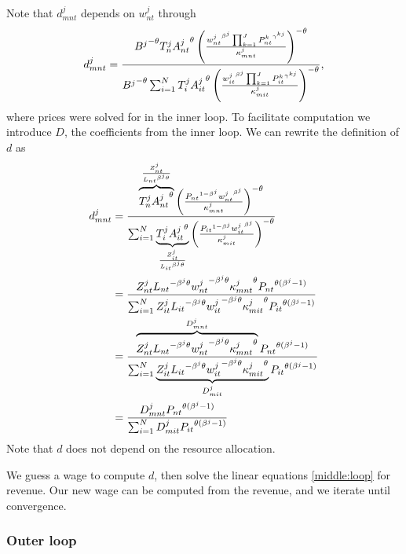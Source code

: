 \documentclass[12pt]{article}
\begin{document}
Note that $d^j_{mnt}$ depends on $w_{nt}^j$ through 
\begin{equation*}
d_{mnt}^j = \frac{{B^j}^{-\theta} T_n^j {A_{nt}^j}^{\theta} \left(\frac{{%
w_{nt}^j}^{\beta^j} \prod_{k = 1}^{J}{P_{nt}^k}^{\gamma^{kj}} }{%
\kappa_{mnt}^j}\right)^{-\theta}}{{B^j}^{-\theta} \sum_{i = 1}^N T_i^j {%
A_{it}^j}^{\theta} \left(\frac{{w_{it}^j}^{\beta^j} \prod_{k = 1}^{J}{%
P_{it}^k}^{\gamma^{kj}} }{\kappa_{mit}^j}\right)^{-\theta}},
\end{equation*}
where prices were solved for in the inner loop. To facilitate computation we
introduce $D$, the coefficients from the inner loop. We can rewrite the
definition of $d$ as 
\begin{align*}
d_{mnt}^j &= \frac{\overbrace{T_n^j {A_{nt}^j}^{\theta}}^{\frac{Z_{nt}^j}{{%
L_{nt}}^{\beta^j\theta}}} \left(\frac{{P_{nt}}^{1 - \beta^j} {w_{nt}^j}%
^{\beta^j}}{\kappa_{mnt}^j}\right)^{-\theta}}{\sum_{i = 1}^N \underbrace{%
T_i^j {A_{it}^j}^{\theta}}_{\frac{Z_{it}^j}{{L_{it}}^{\beta^j\theta}}} \left(%
\frac{{P_{it}}^{1 - \beta^j} {w_{it}^j}^{\beta^j}}{\kappa_{mit}^j}%
\right)^{-\theta}} \\
&= \frac{Z_{nt}^j {L_{nt}}^{- \beta^j\theta} {w_{nt}^j}^{-\beta^j\theta} {%
\kappa_{mnt}^j}^{\theta}{P_{nt}}^{\theta(\beta^j - 1)}}{\sum_{i = 1}^N
Z_{it}^j {L_{it}}^{- \beta^j\theta} {w_{it}^j}^{-\beta^j\theta} {%
\kappa_{mit}^j}^{\theta}{P_{it}}^{\theta(\beta^j - 1)}} \\
&= \frac{\overbrace{Z_{nt}^j {L_{nt}}^{- \beta^j\theta} {w_{nt}^j}%
^{-\beta^j\theta} {\kappa_{mnt}^j}^{\theta}}^{D_{mnt}^j}{P_{nt}}%
^{\theta(\beta^j - 1)}}{\sum_{i = 1}^N \underbrace{Z_{it}^j {L_{it}}^{-
\beta^j\theta} {w_{it}^j}^{-\beta^j\theta} {\kappa_{mit}^j}^{\theta}}%
_{D_{mit}^j}{P_{it}}^{\theta(\beta^j - 1)}} \\
&= \frac{D_{mnt}^j {P_{nt}}^{\theta(\beta^j - 1)}}{\sum_{i = 1}^N D_{mit}^j{%
P_{it}}^{\theta(\beta^j - 1)}}
\end{align*}
Note that $d$ does not depend on the resource allocation.

We guess a wage to compute $d$, then solve the linear equations %
\eqref{middle:loop} for revenue. Our new wage can be computed from the
revenue, and we iterate until convergence.

\subsubsection*{Outer loop}
\end{document}
